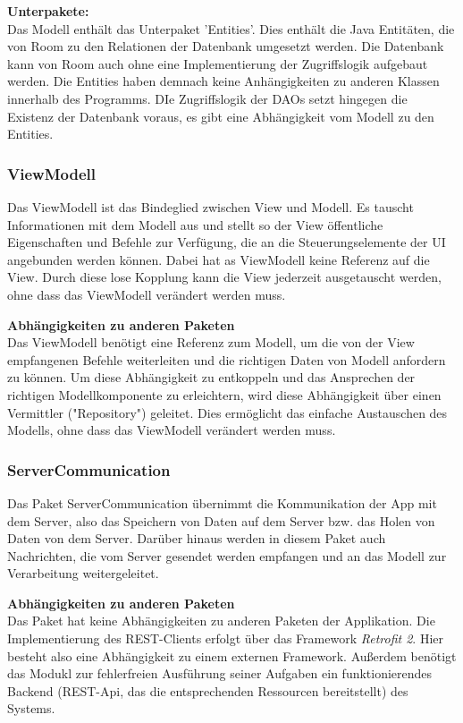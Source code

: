 \documentclass[11pt,a4paper]{report}
\begin{document}
\textbf{Unterpakete:}\\
Das Modell enthält das Unterpaket 'Entities'. Dies enthält die Java Entitäten, die von Room zu den Relationen der Datenbank umgesetzt werden. Die Datenbank kann von Room auch ohne eine Implementierung der Zugriffslogik aufgebaut werden. Die Entities haben demnach keine Anhängigkeiten zu anderen Klassen innerhalb des Programms. DIe Zugriffslogik der DAOs setzt hingegen die Existenz der Datenbank voraus, es gibt eine Abhängigkeit vom Modell zu den Entities.

\subsubsection{ViewModell}
Das ViewModell ist das Bindeglied zwischen View und Modell. Es tauscht Informationen mit dem Modell aus und stellt so der View öffentliche Eigenschaften und Befehle zur Verfügung, die an die Steuerungselemente der UI angebunden werden können. Dabei hat as ViewModell keine Referenz auf die View. Durch diese lose Kopplung kann die View jederzeit ausgetauscht werden, ohne dass das ViewModell verändert werden muss.

\textbf{Abhängigkeiten zu anderen Paketen}\\
Das ViewModell benötigt eine Referenz zum Modell, um die von der View empfangenen Befehle weiterleiten und die richtigen Daten von Modell anfordern zu können. Um diese Abhängigkeit zu entkoppeln und das Ansprechen der richtigen Modellkomponente zu erleichtern, wird diese Abhängigkeit über einen Vermittler ("Repository") geleitet. Dies ermöglicht das einfache Austauschen des Modells, ohne dass das ViewModell verändert werden muss.

\subsubsection{ServerCommunication}
Das Paket ServerCommunication übernimmt die Kommunikation der App mit dem Server, also das Speichern von Daten auf dem Server bzw. das Holen von Daten von dem Server. Darüber hinaus werden in diesem Paket auch Nachrichten, die vom Server gesendet werden empfangen und an das Modell zur Verarbeitung weitergeleitet.

\textbf{Abhängigkeiten zu anderen Paketen}\\
Das Paket hat keine Abhängigkeiten zu anderen Paketen der Applikation. Die Implementierung des REST-Clients erfolgt über das Framework \textit{Retrofit 2}. Hier besteht also eine Abhängigkeit zu einem externen Framework. Außerdem benötigt das Modukl zur fehlerfreien Ausführung seiner Aufgaben ein funktionierendes Backend (REST-Api, das die entsprechenden Ressourcen bereitstellt) des Systems.
\end{document}
